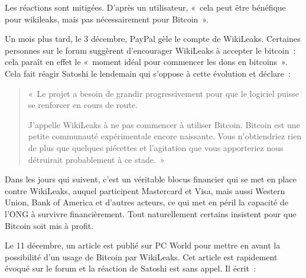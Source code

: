 Les réactions sont mitigées. D'après un utilisateur, «~cela peut être bénéfique pour wikileaks, mais pas nécessairement pour Bitcoin~».

Un mois plus tard, le 3 décembre, PayPal gèle le compte de WikiLeaks. Certaines personnes sur le forum suggèrent d'encourager WikiLeaks à accepter le bitcoin~: cela paraît en effet le «~moment idéal pour commencer les dons en bitcoins~». Cela fait réagir Satoshi le lendemain qui s'oppose à cette évolution et déclare~:

\begin{quote}
«~Le projet a besoin de grandir progressivement pour que le logiciel puisse se renforcer en cours de route.

J'appelle WikiLeaks à ne pas commencer à utiliser Bitcoin. Bitcoin est une petite communauté expérimentale encore naissante. Vous n'obtiendriez rien de plus que quelques piécettes et l'agitation que vous apporteriez nous détruirait probablement à ce stade.~»
\end{quote}

Dans les jours qui suivent, c'est un véritable blocus financier qui se met en place contre WikiLeaks, auquel participent Mastercard et Visa, mais aussi Western Union, Bank of America et d'autres acteurs, ce qui met en péril la capacité de l'ONG à survivre financièrement. Tout naturellement certains insistent pour que Bitcoin soit mis à profit.

Le 11 décembre, un article est publié sur PC World pour mettre en avant la possibilité d'un usage de Bitcoin par WikiLeaks. Cet article est rapidement évoqué sur le forum et la réaction de Satoshi est sans appel. Il écrit~:


